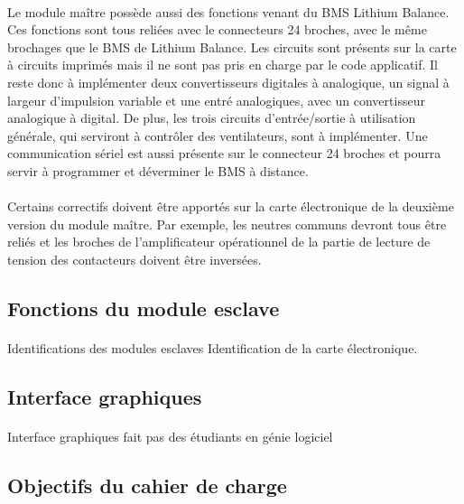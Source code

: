 		\paragraph{}
		Le module maître possède aussi des fonctions venant du BMS Lithium Balance. Ces fonctions sont tous reliées avec le connecteurs 24 broches, avec le même brochages que le BMS de Lithium Balance. Les circuits sont présents sur la carte à circuits imprimés mais il ne sont pas pris en charge par le code applicatif. Il reste donc à implémenter deux convertisseurs digitales à analogique, un signal à largeur d'impulsion variable et une entré analogiques, avec un convertisseur analogique à digital. De plus, les trois circuits d'entrée/sortie à utilisation générale, qui serviront à contrôler des ventilateurs, sont à implémenter. Une communication sériel est aussi présente sur le connecteur 24 broches et pourra servir à programmer et déverminer le BMS à distance.
				
		\paragraph{}	
		Certains correctifs doivent être apportés sur la carte électronique de la deuxième version du module maître. Par exemple, les neutres communs devront tous être reliés et les broches de l'amplificateur opérationnel de la partie de lecture de tension des contacteurs doivent être inversées.

	\subsection{Fonctions du module esclave}	
		
		\paragraph{}		
		Identifications des modules esclaves
		Identification de la carte électronique.
				
	\subsection{Interface graphiques}		
		\paragraph{}	
		Interface graphiques fait pas des étudiants en génie logiciel

	\subsection{Objectifs du cahier de charge}	
	
